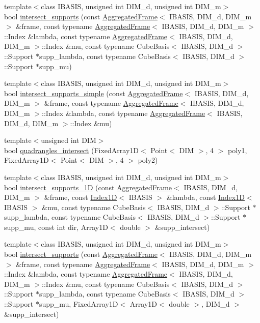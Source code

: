 \begin{CompactItemize}
\item 
{\footnotesize template$<$class IBASIS, unsigned int DIM\_\-d, unsigned int DIM\_\-m$>$ }\\bool \hyperlink{namespaceFrameTL_6d6670ec9613c9cf6ac3511a4b623429}{intersect\_\-supports} (const \hyperlink{classFrameTL_1_1AggregatedFrame}{AggregatedFrame}$<$ IBASIS, DIM\_\-d, DIM\_\-m $>$ \&frame, const typename \hyperlink{classFrameTL_1_1AggregatedFrame}{AggregatedFrame}$<$ IBASIS, DIM\_\-d, DIM\_\-m $>$::Index \&lambda, const typename \hyperlink{classFrameTL_1_1AggregatedFrame}{AggregatedFrame}$<$ IBASIS, DIM\_\-d, DIM\_\-m $>$::Index \&mu, const typename CubeBasis$<$ IBASIS, DIM\_\-d $>$::Support $\ast$supp\_\-lambda, const typename CubeBasis$<$ IBASIS, DIM\_\-d $>$::Support $\ast$supp\_\-mu)
\item 
{\footnotesize template$<$class IBASIS, unsigned int DIM\_\-d, unsigned int DIM\_\-m$>$ }\\bool \hyperlink{namespaceFrameTL_8008f4b3d0a7bb7acab2b74a29d60222}{intersect\_\-supports\_\-simple} (const \hyperlink{classFrameTL_1_1AggregatedFrame}{AggregatedFrame}$<$ IBASIS, DIM\_\-d, DIM\_\-m $>$ \&frame, const typename \hyperlink{classFrameTL_1_1AggregatedFrame}{AggregatedFrame}$<$ IBASIS, DIM\_\-d, DIM\_\-m $>$::Index \&lambda, const typename \hyperlink{classFrameTL_1_1AggregatedFrame}{AggregatedFrame}$<$ IBASIS, DIM\_\-d, DIM\_\-m $>$::Index \&mu)
\item 
{\footnotesize template$<$unsigned int DIM$>$ }\\bool \hyperlink{namespaceFrameTL_0f4762cff5b194a929e2eadddbfd0d71}{quadrangles\_\-intersect} (FixedArray1D$<$ Point$<$ DIM $>$, 4 $>$ poly1, FixedArray1D$<$ Point$<$ DIM $>$, 4 $>$ poly2)
\item 
{\footnotesize template$<$class IBASIS, unsigned int DIM\_\-d, unsigned int DIM\_\-m$>$ }\\bool \hyperlink{namespaceFrameTL_02c30f3ec04242a2445af8e588bae6b2}{intersect\_\-supports\_\-1D} (const \hyperlink{classFrameTL_1_1AggregatedFrame}{AggregatedFrame}$<$ IBASIS, DIM\_\-d, DIM\_\-m $>$ \&frame, const \hyperlink{classFrameTL_1_1Index1D}{Index1D}$<$ IBASIS $>$ \&lambda, const \hyperlink{classFrameTL_1_1Index1D}{Index1D}$<$ IBASIS $>$ \&mu, const typename CubeBasis$<$ IBASIS, DIM\_\-d $>$::Support $\ast$supp\_\-lambda, const typename CubeBasis$<$ IBASIS, DIM\_\-d $>$::Support $\ast$supp\_\-mu, const int dir, Array1D$<$ double $>$ \&supp\_\-intersect)
\item 
{\footnotesize template$<$class IBASIS, unsigned int DIM\_\-d, unsigned int DIM\_\-m$>$ }\\bool \hyperlink{namespaceFrameTL_5aeecded043a910b0dae7228883304b3}{intersect\_\-supports} (const \hyperlink{classFrameTL_1_1AggregatedFrame}{AggregatedFrame}$<$ IBASIS, DIM\_\-d, DIM\_\-m $>$ \&frame, const typename \hyperlink{classFrameTL_1_1AggregatedFrame}{AggregatedFrame}$<$ IBASIS, DIM\_\-d, DIM\_\-m $>$::Index \&lambda, const typename \hyperlink{classFrameTL_1_1AggregatedFrame}{AggregatedFrame}$<$ IBASIS, DIM\_\-d, DIM\_\-m $>$::Index \&mu, const typename CubeBasis$<$ IBASIS, DIM\_\-d $>$::Support $\ast$supp\_\-lambda, const typename CubeBasis$<$ IBASIS, DIM\_\-d $>$::Support $\ast$supp\_\-mu, FixedArray1D$<$ Array1D$<$ double $>$, DIM\_\-d $>$ \&supp\_\-intersect)

\end{CompactItemize}
